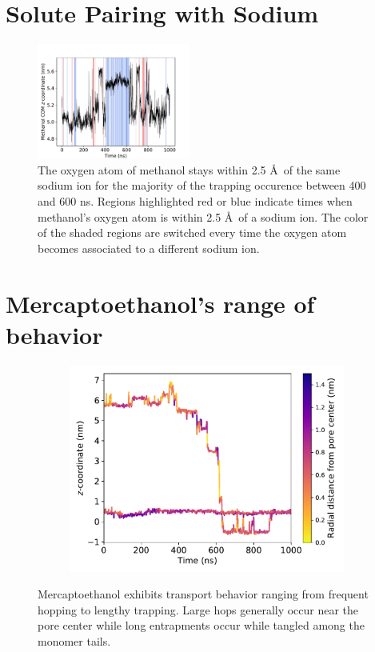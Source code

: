 \documentclass{article}
\begin{document}
  \section{Solute Pairing with Sodium}

  \begin{figure}[!htb]
  \centering
  \includegraphics[width=0.45\textwidth]{na_met_trace.pdf}  %
  \caption{The oxygen atom of methanol stays within 2.5 \AA~of the same sodium ion for
  the majority of the trapping occurence between 400 and 600 ns. Regions
  highlighted red or blue indicate times when methanol's oxygen atom is within 
  2.5 \AA~of a sodium ion. The color of the shaded regions are switched every time
  the oxygen atom becomes associated to a different sodium ion.}\label{fig:na_met_trace}
  \end{figure}
  
  \section{Mercaptoethanol's range of behavior}
  
  \begin{figure}
  \centering
  \begin{subfigure}{0.45\textwidth}
  \includegraphics[width=\linewidth]{SOH_trace.pdf}
  \caption{}\label{fig:SOH_trace}
  \end{subfigure}
  \caption{Mercaptoethanol exhibits transport behavior ranging from frequent hopping
  to lengthy trapping. Large hops generally occur near the pore center while 
  long entrapments occur while tangled among the monomer tails.}
  \end{figure}
  
\end{document}
